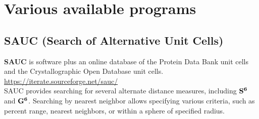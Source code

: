 \documentclass[preprint]{iucr}              %
\numberwithin{equation}{section}
\newcommand{\SVI}[0]{$\bf{S^{6}}$}
\newcommand{\GVI}[0]{$\bf{G^{6}}$}
\begin{document}
%
\section{Various available programs}

\subsection{SAUC (Search of Alternative Unit Cells)}

	\textbf{SAUC} is software plus an online database of the Protein Data Bank unit cells and
the Crystallographic Open Database unit cells. \\
\url{https://iterate.sourceforge.net/sauc/}\\
SAUC provides searching for several alternate distance measures,
including \SVI{} and \GVI{}. Searching by nearest neighbor
allows specifying various criteria, such as percent range, 
nearest neighbors, or within a sphere of specified radius.\\
\end{document}
